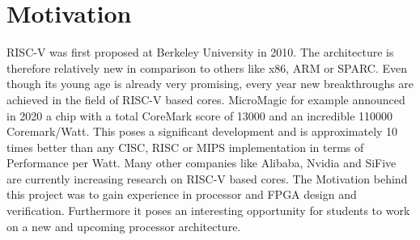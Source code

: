 
\chapter{Motivation}

RISC-V was first proposed at Berkeley University in 2010. The architecture is
therefore relatively new in comparison to others like x86, ARM or SPARC. Even
though its young age is already very promising, every year new breakthroughs are
achieved in the field of RISC-V based cores.
MicroMagic for example announced in 2020 a chip with a total CoreMark score of
13000 and an incredible 110000 Coremark/Watt. This poses a significant
development and is approximately 10 times better than any CISC, RISC or MIPS
implementation in terms of Performance per Watt.
Many other companies like Alibaba, Nvidia and SiFive are currently increasing
research on RISC-V based cores.
The Motivation behind this project was to gain experience in processor and \ac{FPGA}
design and verification. Furthermore it poses an interesting opportunity for students
to work on a new and upcoming processor architecture.
